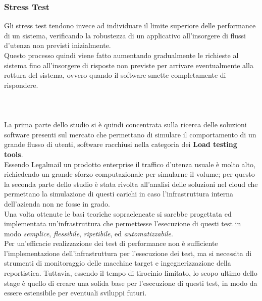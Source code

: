 \subsubsection{Stress Test}
Gli stress test tendono invece ad individuare il limite superiore delle performance di un sistema, verificando la robustezza di un applicativo all'insorgere di flussi d'utenza non previsti inizialmente. \\
Questo processo quindi viene fatto aumentando gradualmente le richieste al sistema fino all'insorgere di risposte non previste per arrivare eventualmente alla rottura del sistema, ovvero quando il software smette completamente di rispondere. \\\\\\\\
La prima parte dello studio si è quindi concentrata sulla ricerca delle soluzioni software presenti sul mercato che permettano di simulare il comportamento di un grande flusso di utenti, software racchiusi nella categoria dei \textbf{Load testing tools}. \\
Essendo Legalmail un prodotto enterprise il traffico d'utenza usuale è molto alto, richiedendo un grande sforzo computazionale per simularne il volume; per questo la seconda parte dello studio è stata rivolta all'analisi delle soluzioni nel cloud che permettano la simulazione di questi carichi in caso l'infrastruttura interna dell'azienda non ne fosse in grado. \\
Una volta ottenute le basi teoriche sopraelencate si sarebbe progettata ed implementata un'infrastruttura che permettesse l'esecuzione di questi test in modo \textit{semplice}, \textit{flessibile}, \textit{ripetibile}, ed \textit{automatizzabile}.\\
Per un'efficacie realizzazione dei test di performance non è sufficiente l'implementazione dell'infrastruttura per l'esecuzione dei test, ma si necessita di strumenti di monitoraggio delle macchine target e ingegnerizzazione della reportistica. Tuttavia, essendo il tempo di tirocinio limitato, lo scopo ultimo dello stage è quello di creare una solida base per l'esecuzione di questi test, in modo da essere estensibile per eventuali sviluppi futuri.



